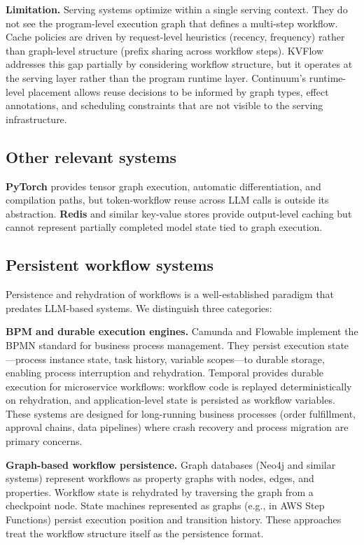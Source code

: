 \documentclass[10pt,twocolumn]{article}
\begin{document}
\textbf{Limitation.} Serving systems optimize within a single serving context. They do not see the program-level execution graph that defines a multi-step workflow. Cache policies are driven by request-level heuristics (recency, frequency) rather than graph-level structure (prefix sharing across workflow steps). KVFlow addresses this gap partially by considering workflow structure, but it operates at the serving layer rather than the program runtime layer. Continuum's runtime-level placement allows reuse decisions to be informed by graph types, effect annotations, and scheduling constraints that are not visible to the serving infrastructure.

\subsection{Other relevant systems}

\textbf{PyTorch} \cite{paszke2019pytorch} provides tensor graph execution, automatic differentiation, and compilation paths, but token-workflow reuse across LLM calls is outside its abstraction. \textbf{Redis} \cite{redis2024docs} and similar key-value stores provide output-level caching but cannot represent partially completed model state tied to graph execution.

\subsection{Persistent workflow systems}

Persistence and rehydration of workflows is a well-established paradigm that predates LLM-based systems. We distinguish three categories:

\textbf{BPM and durable execution engines.}
Camunda \cite{camunda2024docs} and Flowable \cite{flowable2024docs} implement the BPMN standard for business process management. They persist execution state---process instance state, task history, variable scopes---to durable storage, enabling process interruption and rehydration. Temporal \cite{temporal2024docs,roemer2020temporal} provides durable execution for microservice workflows: workflow code is replayed deterministically on rehydration, and application-level state is persisted as workflow variables. These systems are designed for long-running business processes (order fulfillment, approval chains, data pipelines) where crash recovery and process migration are primary concerns.

\textbf{Graph-based workflow persistence.}
Graph databases (Neo4j and similar systems) represent workflows as property graphs with nodes, edges, and properties. Workflow state is rehydrated by traversing the graph from a checkpoint node. State machines represented as graphs (e.g., in AWS Step Functions) persist execution position and transition history. These approaches treat the workflow structure itself as the persistence format.
\end{document}
